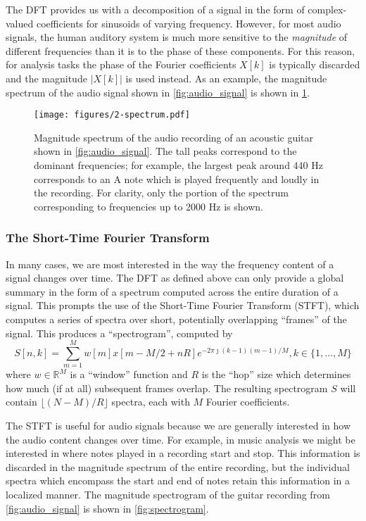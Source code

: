 The DFT provides us with a decomposition of a signal in the form of complex-valued coefficients for sinusoids of varying frequency.
However, for most audio signals, the human auditory system is much more sensitive to the {\em magnitude} of different frequencies than it is to the phase of these components.
For this reason, for analysis tasks the phase of the Fourier coefficients $X[k]$ is typically discarded and the magnitude $|X[k]|$ is used instead.
As an example, the magnitude spectrum of the audio signal shown in \cref{fig:audio_signal} is shown in \cref{fig:spectrum}.

\begin{figure}
  \centering
  \texttt{[image: figures/2-spectrum.pdf]}
  \caption[Magnitude spectrum of the acoustic guitar recording]{Magnitude spectrum of the audio recording of an acoustic guitar shown in \cref{fig:audio_signal}.
  The tall peaks correspond to the dominant frequencies; for example, the largest peak around 440 Hz corresponds to an A note which is played frequently and loudly in the recording.
  For clarity, only the portion of the spectrum corresponding to frequencies up to 2000 Hz is shown.}
  \label{fig:spectrum}
\end{figure}

\subsubsection{The Short-Time Fourier Transform}

In many cases, we are most interested in the way the frequency content of a signal changes over time.
The DFT as defined above can only provide a global summary in the form of a spectrum computed across the entire duration of a signal.
This prompts the use of the Short-Time Fourier Transform (STFT), which computes a series of spectra over short, potentially overlapping ``frames'' of the signal.
This produces a ``spectrogram'', computed by
\begin{equation}
        S[n, k] = \sum_{m = 1}^M w[m]x[m - M/2 + nR] e^{-2\pi \jmath (k - 1)(m - 1)/M}, k \in \{1, \ldots, M\}
\end{equation}
where $w \in \mathbb{R}^{M}$ is a ``window'' function and $R$ is the ``hop'' size which determines how much (if at all) subsequent frames overlap.
The resulting spectrogram $S$ will contain $\lfloor (N - M)/R \rfloor$ spectra, each with $M$ Fourier coefficients.

The STFT is useful for audio signals because we are generally interested in how the audio content changes over time.
For example, in music analysis we might be interested in where notes played in a recording start and stop.
This information is discarded in the magnitude spectrum of the entire recording, but the individual spectra which encompass the start and end of notes retain this information in a localized manner.
The magnitude spectrogram of the guitar recording from \cref{fig:audio_signal} is shown in \cref{fig:spectrogram}.

